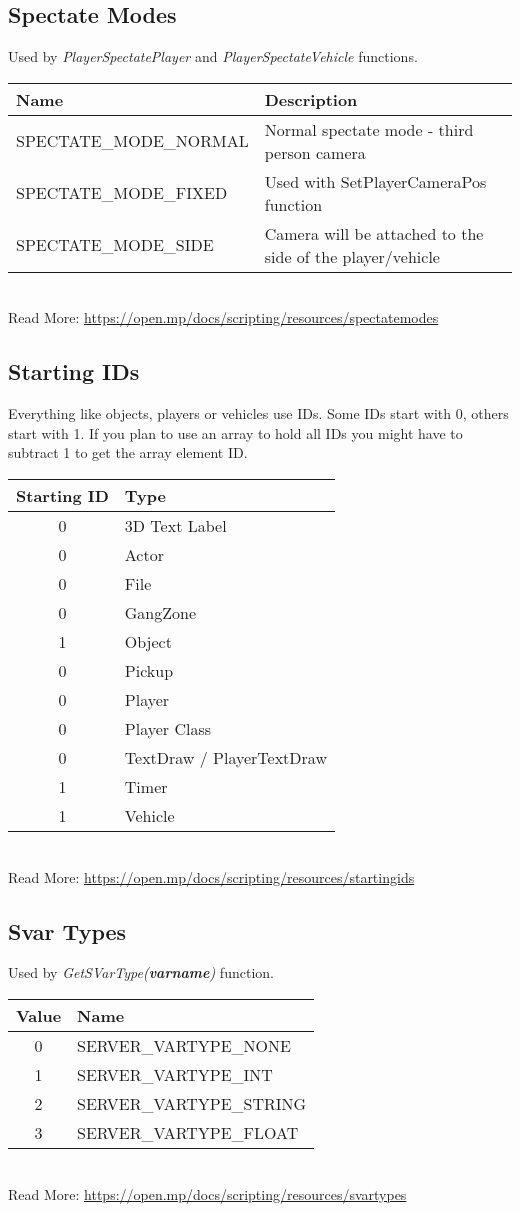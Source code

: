 \documentclass{article}
\begin{document}
\subsection{Spectate Modes}
Used by \textit{PlayerSpectatePlayer} and \textit{PlayerSpectateVehicle} functions.
\bigskip
\\\begin{tabular}{ |l|l| }
\hline
Name & Description \\
\hline
SPECTATE\_MODE\_NORMAL & Normal spectate mode - third person camera \\
SPECTATE\_MODE\_FIXED & Used with SetPlayerCameraPos function \\
SPECTATE\_MODE\_SIDE & Camera will be attached to the side of the player/vehicle \\
\hline
\end{tabular}
\bigskip
\\Read More: \url{https://open.mp/docs/scripting/resources/spectatemodes}


\newpage
\subsection{Starting IDs}
Everything like objects, players or vehicles use IDs. Some IDs start with 0, others start with 1. If you plan to use an array to hold all IDs you might have to subtract 1 to get the array element ID.
\bigskip
\\\begin{tabular}{ |c|l| }
\hline
Starting ID & Type \\
\hline
0 & 3D Text Label \\
0 & Actor \\
0 & File \\
0 & GangZone \\
1 & Object \\
0 & Pickup \\
0 & Player \\
0 & Player Class \\
0 & TextDraw / PlayerTextDraw \\
1 & Timer \\
1 & Vehicle \\
\hline
\end{tabular}
\bigskip
\\Read More: \url{https://open.mp/docs/scripting/resources/startingids}


\subsection{Svar Types}
Used by \textit{GetSVarType(\textbf{varname})} function.
\bigskip
\\\begin{tabular}{ |c|l| }
\hline
Value & Name \\
\hline
0 & SERVER\_VARTYPE\_NONE \\
1 & SERVER\_VARTYPE\_INT \\
2 & SERVER\_VARTYPE\_STRING \\
3 & SERVER\_VARTYPE\_FLOAT \\
\hline
\end{tabular}
\bigskip
\\Read More: \url{https://open.mp/docs/scripting/resources/svartypes}
\end{document}
